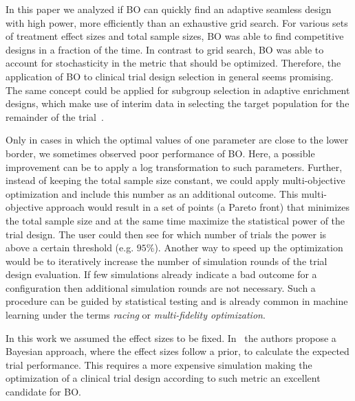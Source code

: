 \documentclass[bimj,fleqn]{w-art}
\theoremstyle{plain}
\theoremstyle{definition}
\begin{document}
In this paper we analyzed if BO can quickly find an adaptive seamless design with high power, more efficiently than an exhaustive grid search.
For various sets of treatment effect sizes and total sample sizes, BO was able to find competitive designs in a fraction of the time.
In contrast to grid search, BO was able to account for stochasticity in the metric that should be optimized.
Therefore, the application of BO to clinical trial design selection in general seems promising. The same concept could be applied for subgroup selection in adaptive enrichment designs, which make use of interim data in selecting the target population for the remainder of the trial~\citep{burnett_adaptive_2020}.

Only in cases in which the optimal values of one parameter are close to the lower border, we sometimes observed poor performance of BO.
Here, a possible improvement can be to apply a log transformation to such parameters. %
Further, instead of keeping the total sample size constant, we could apply multi-objective optimization and include this number as an additional outcome.
This multi-objective approach would result in a set of points (a Pareto front) that minimizes the total sample size and at the same time maximize the statistical power of the trial design.
The user could then see for which number of trials the power is above a certain threshold (e.g. $95\%$).
Another way to speed up the optimization would be to iteratively increase the number of simulation rounds of the trial design evaluation. 
If few simulations already indicate a bad outcome for a configuration then additional simulation rounds are not necessary.
Such a procedure can be guided by statistical testing and is already common in machine learning under the terms \emph{racing} or \emph{multi-fidelity optimization}.


In this work we assumed the effect sizes to be fixed. %
In~\citet{stallard_optimal_2009} the authors propose a Bayesian approach, where the effect sizes follow a prior, to calculate the expected trial performance.
This requires a more expensive simulation making the optimization of a clinical trial design according to such metric an excellent candidate for BO.
\end{document}
